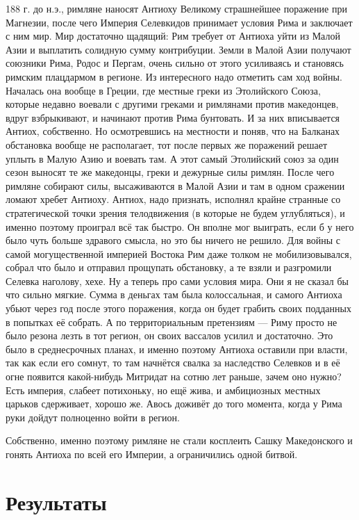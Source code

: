 188 г. до н.э., римляне наносят Антиоху Великому страшнейшее поражение при Магнезии, после чего Империя Селевкидов принимает условия Рима и заключает с ним мир. Мир достаточно щадящий: Рим требует от Антиоха уйти из Малой Азии и выплатить солидную сумму контрибуции. Земли в Малой Азии получают союзники Рима, Родос и Пергам, очень сильно от этого усиливаясь и становясь римским плацдармом в регионе. Из интересного надо отметить сам ход войны. Началась она вообще в Греции, где местные греки из Этолийского Союза, которые недавно воевали с другими греками и римлянами против македонцев, вдруг взбрыкивают, и начинают против Рима бунтовать. И за них вписывается Антиох, собственно. Но осмотревшись на местности и поняв, что на Балканах обстановка вообще не располагает, тот после первых же поражений решает уплыть в Малую Азию и воевать там. А этот самый Этолийский союз за один сезон выносят те же македонцы, греки и дежурные силы римлян. После чего римляне собирают силы, высаживаются в Малой Азии и там в одном сражении ломают хребет Антиоху. Антиох, надо признать, исполнял крайне странные со стратегической точки зрения телодвижения (в которые не будем углубляться), и именно поэтому проиграл всё так быстро. Он вполне мог выиграть, если б у него было чуть больше здравого смысла, но это бы ничего не решило. Для войны с самой могущественной империей Востока Рим даже толком не мобилизовывался, собрал что было и отправил прощупать обстановку, а те взяли и разгромили Селевка наголову, хехе. Ну а теперь про сами условия мира. Они я не сказал бы что сильно мягкие. Сумма в деньгах там была колоссальная, и самого Антиоха убьют через год после этого поражения, когда он будет грабить своих подданных в попытках её собрать. А по территориальным претензиям — Риму просто не было резона лезть в тот регион, он своих вассалов усилил и достаточно. Это было в среднесрочных планах, и именно поэтому Антиоха оставили при власти, так как если его сомнут, то там начнётся свалка за наследство Селевков и в её огне появится какой-нибудь Митридат на сотню лет раньше, зачем оно нужно? Есть империя, слабеет потихоньку, но ещё жива, и амбициозных местных царьков сдерживает, хорошо же. Авось доживёт до того момента, когда у Рима руки дойдут полноценно войти в регион.

Собственно, именно поэтому римляне не стали косплеить Сашку Македонского и гонять Антиоха по всей его Империи, а ограничились одной битвой.

\section{Результаты}

